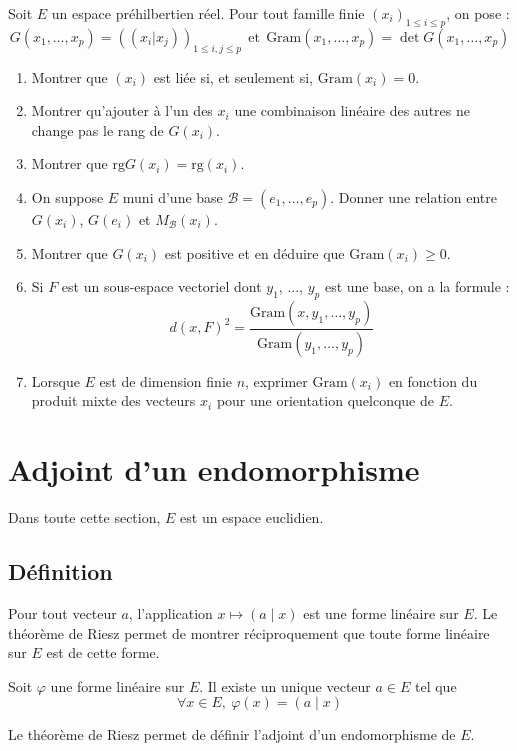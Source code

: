 \documentclass[french]{article}
\theoremstyle{plain}
\theoremstyle{definition}
\theoremstyle{remark}
\begin{document}
Soit $E$ un espace préhilbertien réel. Pour tout famille finie $(x_i)_{1\leqslant i\leqslant p}$, on pose : $$G(x_1,\ldots,x_p)=((x_i|x_j))_{1\leqslant i,j\leqslant p}\ \ \text{et} \ \ \text{Gram}(x_1,\ldots,x_p)=\det G(x_1,\ldots,x_p)$$
\begin{enumerate}
	\item Montrer que $(x_i)$ est liée si, et seulement si, $\text{Gram}(x_i)=0$.
	\item Montrer qu'ajouter à l'un des $x_i$ une combinaison linéaire des autres ne change pas le rang de $G(x_i)$.
	\item Montrer que $\text{rg}G(x_i)=\text{rg}(x_i)$.
	\item On suppose $E$ muni d'une base $\mathcal{B}=(e_1,\ldots,e_p)$. Donner une relation entre $G(x_i)$, $G(e_i)$ et $M_\mathcal{B}(x_i)$.
	\item Montrer que $G(x_i)$ est positive et en déduire que $\text{Gram}(x_i)\geqslant0$.
	\item Si $F$ est un sous-espace vectoriel dont $y_1$, ..., $y_p$ est une base, on a la formule : $$d(x,F)^2=\frac{\text{Gram}(x,y_1,\ldots,y_p)}{\text{Gram}(y_1,\ldots,y_p)}$$
	\item Lorsque $E$ est de dimension finie $n$, exprimer $\text{Gram}(x_i)$ en fonction du produit mixte des vecteurs $x_i$ pour une orientation quelconque de $E$.
\end{enumerate}

\section{Adjoint d'un endomorphisme}

Dans toute cette section, $E$ est un espace euclidien.

\subsection{Définition}

Pour tout vecteur $a$, l'application $x\mapsto (a\mid x)$ est une forme linéaire sur $E$. Le théorème de Riesz permet de montrer réciproquement que toute forme linéaire sur $E$ est de cette forme.

\begin{thm}{}
	Soit $\varphi$ une forme linéaire sur $E$. Il existe un unique vecteur $a\in E$ tel que $$\forall x\in E,\ \varphi(x)=(a\mid x)$$
\end{thm}

Le théorème de Riesz permet de définir l'adjoint d'un endomorphisme de $E$.
\end{document}
